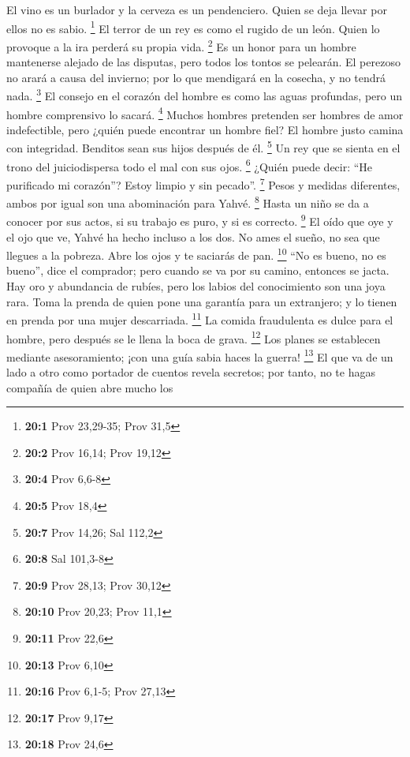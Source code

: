  El vino es un burlador y la cerveza es un pendenciero.
Quien se deja llevar por ellos no es sabio. \footnote{\textbf{20:1} Prov
  23,29-35; Prov 31,5}  El terror de un rey es como el
rugido de un león. Quien lo provoque a la ira perderá su propia vida.
\footnote{\textbf{20:2} Prov 16,14; Prov 19,12}  Es un
honor para un hombre mantenerse alejado de las disputas, pero todos los
tontos se pelearán.  El perezoso no arará a causa del
invierno; por lo que mendigará en la cosecha, y no tendrá nada.
\footnote{\textbf{20:4} Prov 6,6-8}  El consejo en el
corazón del hombre es como las aguas profundas, pero un hombre
comprensivo lo sacará. \footnote{\textbf{20:5} Prov 18,4} 
Muchos hombres pretenden ser hombres de amor indefectible, pero ¿quién
puede encontrar un hombre fiel?  El hombre justo camina
con integridad. Benditos sean sus hijos después de él. \footnote{\textbf{20:7}
  Prov 14,26; Sal 112,2}  Un rey que se sienta en el trono
del juiciodispersa todo el mal con sus ojos. \footnote{\textbf{20:8} Sal
  101,3-8}  ¿Quién puede decir: ``He purificado mi
corazón''? Estoy limpio y sin pecado''. \footnote{\textbf{20:9} Prov
  28,13; Prov 30,12}  Pesos y medidas diferentes, ambos
por igual son una abominación para Yahvé. \footnote{\textbf{20:10} Prov
  20,23; Prov 11,1}  Hasta un niño se da a conocer por
sus actos, si su trabajo es puro, y si es correcto. \footnote{\textbf{20:11}
  Prov 22,6}  El oído que oye y el ojo que ve, Yahvé ha
hecho incluso a los dos.  No ames el sueño, no sea que
llegues a la pobreza. Abre los ojos y te saciarás de pan. \footnote{\textbf{20:13}
  Prov 6,10}  ``No es bueno, no es bueno'', dice el
comprador; pero cuando se va por su camino, entonces se jacta.
 Hay oro y abundancia de rubíes, pero los labios del
conocimiento son una joya rara.  Toma la prenda de quien
pone una garantía para un extranjero; y lo tienen en prenda por una
mujer descarriada. \footnote{\textbf{20:16} Prov 6,1-5; Prov 27,13}
 La comida fraudulenta es dulce para el hombre, pero
después se le llena la boca de grava. \footnote{\textbf{20:17} Prov 9,17}
 Los planes se establecen mediante asesoramiento; ¡con
una guía sabia haces la guerra! \footnote{\textbf{20:18} Prov 24,6}
 El que va de un lado a otro como portador de cuentos
revela secretos; por tanto, no te hagas compañía de quien abre mucho los
